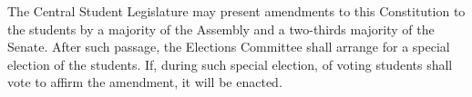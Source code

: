 
The Central Student Legislature may present amendments to this Constitution to the students by a  majority of the Assembly and a two-thirds majority of the Senate. After such passage, the Elections Committee shall arrange for a special election of the students. If, during such special election,  of voting students shall vote to affirm the amendment, it will be enacted.

